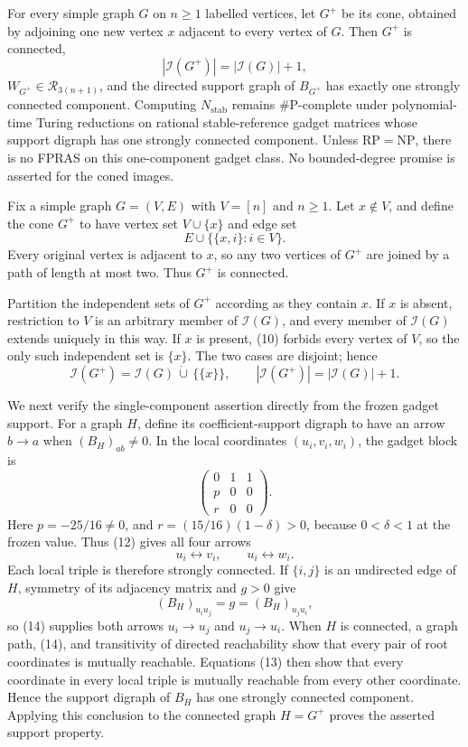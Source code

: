 For every simple graph \(G\) on \(n\geq1\) labelled vertices, let \(G^+\) be its cone, obtained by adjoining one new vertex \(x\) adjacent to every vertex of \(G\). Then \(G^+\) is connected,
\[
 |\mathcal I(G^+)|=|\mathcal I(G)|+1,
\]
\(W_{G^+}\in\mathcal R_{3(n+1)}\), and the directed support graph of \(B_{G^+}\) has exactly one strongly connected component. Computing \(N_{\mathrm{stab}}\) remains \(\#\mathrm P\)-complete under polynomial-time Turing reductions on rational stable-reference gadget matrices whose support digraph has one strongly connected component. Unless \(\mathrm{RP}=\mathrm{NP}\), there is no FPRAS on this one-component gadget class. No bounded-degree promise is asserted for the coned images.

Fix a simple graph \(G=(V,E)\) with \(V=[n]\) and \(n\geq1\). Let \(x\notin V\), and define the cone \(G^+\) to have vertex set \(V\cup\{x\}\) and edge set
\[
 E\cup\bigl\{\{x,i\}:i\in V\bigr\}. \tag{10}
\]
Every original vertex is adjacent to \(x\), so any two vertices of \(G^+\) are joined by a path of length at most two. Thus \(G^+\) is connected.

Partition the independent sets of \(G^+\) according as they contain \(x\). If \(x\) is absent, restriction to \(V\) is an arbitrary member of \(\mathcal I(G)\), and every member of \(\mathcal I(G)\) extends uniquely in this way. If \(x\) is present, (10) forbids every vertex of \(V\), so the only such independent set is \(\{x\}\). The two cases are disjoint; hence
\[
 \mathcal I(G^+)
 =\mathcal I(G)\,\dot\cup\,\bigl\{\{x\}\bigr\},
 \qquad
 |\mathcal I(G^+)|=|\mathcal I(G)|+1. \tag{11}
\]

We next verify the single-component assertion directly from the frozen gadget support. For a graph \(H\), define its coefficient-support digraph to have an arrow \(b\to a\) when \((B_H)_{ab}\neq0\). In the local coordinates \((u_i,v_i,w_i)\), the gadget block is
\[
 \begin{pmatrix}
 0&1&1\\
 p&0&0\\
 r&0&0
 \end{pmatrix}. \tag{12}
\]
Here \(p=-25/16\neq0\), and \(r=(15/16)(1-\delta)>0\), because \(0<\delta<1\) at the frozen value. Thus (12) gives all four arrows
\[
 u_i\longleftrightarrow v_i,
 \qquad
 u_i\longleftrightarrow w_i. \tag{13}
\]
Each local triple is therefore strongly connected. If \(\{i,j\}\) is an undirected edge of \(H\), symmetry of its adjacency matrix and \(g>0\) give
\[
 (B_H)_{u_i u_j}=g=(B_H)_{u_j u_i}, \tag{14}
\]
so (14) supplies both arrows \(u_i\to u_j\) and \(u_j\to u_i\). When \(H\) is connected, a graph path, (14), and transitivity of directed reachability show that every pair of root coordinates is mutually reachable. Equations (13) then show that every coordinate in every local triple is mutually reachable from every other coordinate. Hence the support digraph of \(B_H\) has one strongly connected component. Applying this conclusion to the connected graph \(H=G^+\) proves the asserted support property.

